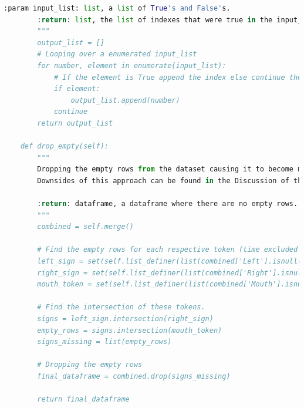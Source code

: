 \begin{lstlisting}[language=Python, caption=Section 6. Show is the Python code to merge the multiple CSV-files into one DataFrame.]
        :param input_list: list, a list of True's and False's.
        :return: list, the list of indexes that were true in the input_list.
        """
        output_list = []
        # Looping over a enumerated input_list
        for number, element in enumerate(input_list):
            # If the element is True append the index else continue the loop
            if element:
                output_list.append(number)
            continue
        return output_list

    def drop_empty(self):
        """
        Dropping the empty rows from the dataset causing it to become more information packed.
        Downsides of this approach can be found in the Discussion of the written Thesis.

        :return: dataframe, a dataframe where there are no empty rows.
        """
        combined = self.merge()

        # Find the empty rows for each respective token (time excluded since it is always present).
        left_sign = set(self.list_definer(list(combined['Left'].isnull().values)))
        right_sign = set(self.list_definer(list(combined['Right'].isnull().values)))
        mouth_token = set(self.list_definer(list(combined['Mouth'].isnull().values)))

        # Find the intersection of these tokens.
        signs = left_sign.intersection(right_sign)
        empty_rows = signs.intersection(mouth_token)
        signs_missing = list(empty_rows)

        # Dropping the empty rows
        final_dataframe = combined.drop(signs_missing)

        return final_dataframe
\end{lstlisting}
 

